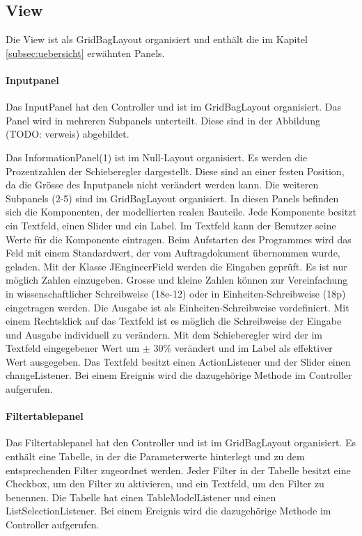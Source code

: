 \subsection{View} \label{subsec:view}
Die View ist als GridBagLayout organisiert und enthält die im Kapitel \ref{subsec:uebersicht} erwähnten Panels.
\bigskip

\paragraph{Inputpanel} \label{par:inputpanel}
Das InputPanel hat den Controller und ist im GridBagLayout organisiert. Das Panel wird in mehreren Subpanels unterteilt. Diese sind in der Abbildung (TODO: verweis) abgebildet. 


Das InformationPanel(1) ist im Null-Layout organisiert. Es werden die Prozentzahlen der Schieberegler dargestellt. Diese sind an einer festen Position, da die Grösse des Inputpanels nicht verändert werden kann. Die weiteren Subpanels (2-5) sind im GridBagLayout organisiert. In diesen Panels befinden sich die Komponenten, der modellierten realen Bauteile. Jede Komponente besitzt ein Textfeld, einen Slider und ein Label. Im Textfeld kann der Benutzer seine Werte für die Komponente eintragen. Beim Aufstarten des Programmes wird das Feld mit einem Standardwert, der vom Auftragdokument übernommen wurde, geladen. Mit der Klasse JEngineerField werden die Eingaben geprüft. Es ist nur möglich Zahlen einzugeben. Grosse und kleine Zahlen können zur Vereinfachung in wissenschaftlicher Schreibweise (18e-12) oder in Einheiten-Schreibweise (18p) eingetragen werden. Die Ausgabe ist als Einheiten-Schreibweise vordefiniert. Mit einem Rechtsklick auf das Textfeld ist es möglich die Schreibweise der Eingabe und Ausgabe individuell zu verändern.
Mit dem Schieberegler wird der im Textfeld eingegebener Wert um $\pm$ 30\% verändert und im Label als effektiver Wert ausgegeben. Das Textfeld besitzt einen ActionListener und der Slider einen changeListener. Bei einem Ereignis wird die dazugehörige Methode im Controller  aufgerufen.
\bigskip

\paragraph{Filtertablepanel} \label{par:filterpanel}
Das Filtertablepanel hat den Controller und ist im GridBagLayout organisiert. Es enthält eine Tabelle, in der die Parameterwerte hinterlegt und zu dem entsprechenden Filter zugeordnet werden. Jeder Filter in der Tabelle besitzt eine Checkbox, um den Filter zu aktivieren, und ein Textfeld, um den Filter  zu benennen. Die Tabelle hat einen TableModelListener und einen ListSelectionListener. Bei einem Ereignis wird die dazugehörige Methode im Controller  aufgerufen.
\bigskip

